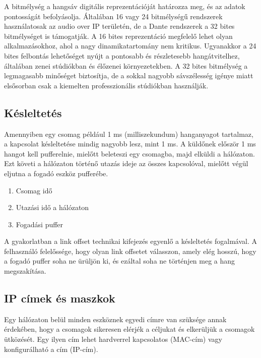 A bitmélység a hangsáv digitális reprezentációját határozza meg, és az adatok pontosságát befolyásolja.
Általában 16 vagy 24 bitmélységű rendszerek használatosak az audio over IP területén, de a Dante rendszerek a 
32 bites bitmélységet is támogatják. A 16 bites reprezentáció megfelelő lehet olyan alkalmazásokhoz, ahol a nagy
dinamikatartomány nem kritikus. Ugyanakkor a 24 bites felbontás lehetőséget nyújt a pontosabb és részletesebb hangátvitelhez,
általában zenei stúdiókban és élőzenei környezetekben. 
A 32 bites bitmélység a legmagasabb minőséget biztosítja, de a sokkal nagyobb sávszélesség igénye miatt elsősorban csak
a kiemelten professzionális stúdiókban használják.
\subsection{Késleltetés}
Amennyiben egy csomag például 1 ms (milliszekundum) hanganyagot tartalmaz, a kapcsolat
késleltetése mindig nagyobb lesz, mint 1 ms.
A küldőnek először 1 ms hangot kell pufferelnie, mielőtt beleteszi egy csomagba, majd elküldi a hálózaton.
Ezt követi a hálózaton történő utazás ideje az összes kapcsolóval, mielőtt végül eljutna a fogadó eszköz pufferébe.
\begin{enumerate}
    \item Csomag idő
    \item Utazási idő a hálózaton
    \item Fogadási puffer
\end{enumerate}
A gyakorlatban a link offset technikai kifejezés egyenlő a késleltetés fogalmával.
A felhasználó felelőssége, hogy olyan link offsetet válasszon, amely elég hosszú, hogy a fogadó puffer soha ne ürüljön ki, és
ezáltal soha ne történjen meg a hang megszakítása. 
\subsection{IP címek és maszkok}
Egy hálózaton belül minden eszköznek egyedi címre van szüksége annak érdekében,
hogy a csomagok sikeresen elérjék a céljukat és elkerüljük a csomagok ütközését.
Egy ilyen cím lehet hardverrel kapcsolatos (MAC-cím) vagy konfigurálható a cím (IP-cím).
